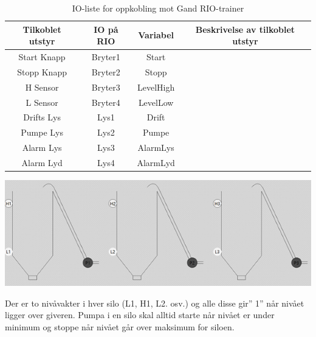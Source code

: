 \documentclass[12pt,a4paper]{article}
\begin{document}
\begin{table}[]
\begin{centering}
\begin{tabular}{|c|c|c|c|}
\hline 
Tilkoblet utstyr & IO på RIO & Variabel & Beskrivelse av tilkoblet utstyr\tabularnewline
\hline 
\hline 
Start Knapp & Bryter1 & Start & \tabularnewline
\hline 
Stopp Knapp & Bryter2 & Stopp & \tabularnewline
\hline 
H Sensor & Bryter3 & LevelHigh & \tabularnewline
\hline 
L Sensor & Bryter4 & LevelLow & \tabularnewline
\hline 
Drifts Lys & Lys1 & Drift & \tabularnewline
\hline 
Pumpe Lys & Lys2 & Pumpe & \tabularnewline
\hline 
Alarm Lys & Lys3 & AlarmLys & \tabularnewline
\hline 
Alarm Lyd & Lys4 & AlarmLyd & \tabularnewline
\hline 
\end{tabular}
\par\end{centering}
\caption{IO-liste for oppkobling mot Gand RIO-trainer}
\end{table}

\includegraphics[width=1\textwidth]{i08012x02.png}

Der er to nivåvakter i hver silo (L1, H1, L2. osv.) og alle disse
gir\textquotedblright{} 1\textquotedblright{} når nivået ligger over
giveren. Pumpa i en silo skal alltid starte når nivået er under minimum
og stoppe når nivået går over maksimum for siloen.
\end{document}
